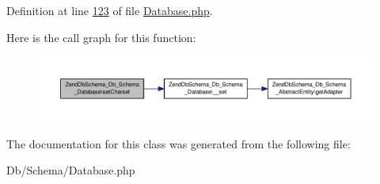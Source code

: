 Definition at line \hyperlink{Database_8php_source_l00123}{123} of file \hyperlink{Database_8php_source}{Database.\-php}.



Here is the call graph for this function\-:\nopagebreak
\begin{figure}[H]
\begin{center}
\leavevmode
\includegraphics[width=350pt]{classZendDbSchema__Db__Schema__Database_acfc530f3381e35f7d57676c4dcff3620_cgraph}
\end{center}
\end{figure}




The documentation for this class was generated from the following file\-:\begin{DoxyCompactItemize}
\item 
Db/\-Schema/Database.\-php\end{DoxyCompactItemize}
